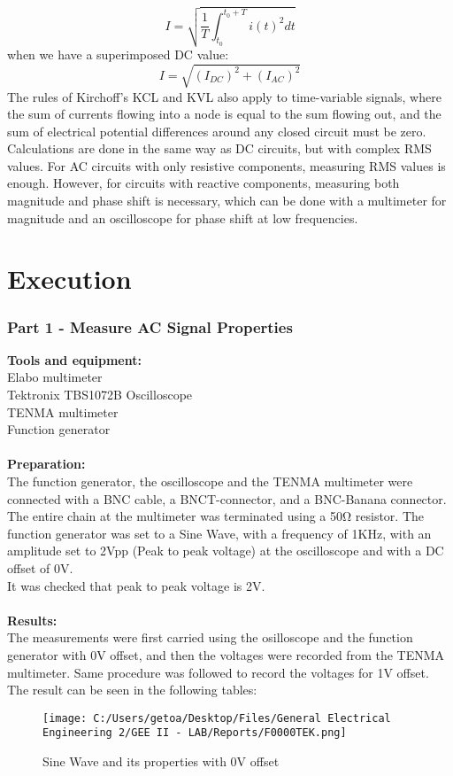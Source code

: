 \documentclass[12pt]{report}
\begin{document}
 $$ I=\sqrt{\frac{1}{T}\int_{t_0}^{t_0+T}i(t)^2 dt}  $$
when we have a superimposed DC value: 
$$ I = \sqrt {(I_{DC})^2+(I_{AC})^2} $$
The rules of Kirchoff's KCL and KVL also apply to time-variable signals, where the sum of currents flowing into a node is equal to the sum flowing out, and the sum of electrical potential differences around any closed circuit must be zero. Calculations are done in the same way as DC circuits, but with complex RMS values. For AC circuits with only resistive components, measuring RMS values is enough. However, for circuits with reactive components, measuring both magnitude and phase shift is necessary, which can be done with a multimeter for magnitude and an oscilloscope for phase shift at low frequencies.
\chapter{Execution}
\subsection {Part 1 - Measure AC Signal Properties} 
\textbf{Tools and equipment:} \\
Elabo multimeter\\Tektronix TBS1072B Oscilloscope \\
TENMA multimeter\\  Function generator  \\ 
\\
\textbf{Preparation:} \\
The function generator, the oscilloscope and the TENMA multimeter were connected with a BNC cable, a BNCT-connector, and a BNC-Banana connector. The entire chain at the multimeter was terminated using a 50Ω resistor. The function generator was set to a Sine Wave, with a frequency of 1KHz, with an amplitude set to 2Vpp (Peak to peak voltage) at the oscilloscope and with a DC offset of 0V. \\
It was checked that peak to peak voltage is 2V.\\
\\
\textbf{Results:} \\
The measurements were first carried using the osilloscope and the function generator with 0V offset, and then the voltages were recorded from the TENMA multimeter. Same procedure was followed to record the voltages for 1V offset. The result can be seen in the following tables:
\begin{figure}[h]
  \centering
  \texttt{[image: C:/Users/getoa/Desktop/Files/General Electrical Engineering 2/GEE II - LAB/Reports/F0000TEK.png]}
  \caption{Sine Wave and its properties with 0V offset}
\end{figure} 
\end{document}
